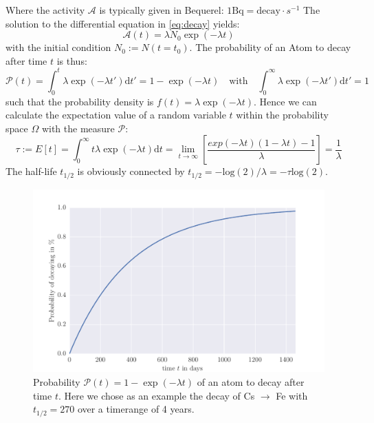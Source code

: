 Where the activity $\mathcal{A}$ is typically given in Bequerel: $1 \textrm{Bq}= \textrm{decay}\cdot s^{-1}$ 
The solution to the differential equation in \eqref{eq:decay} yields:
\begin{equation}
    \mathcal{A}(t) = \lambda N_0 \exp(-\lambda t)
\end{equation}
with the initial condition $N_0 := N(t=t_0)$. 
The probability of an Atom to decay after time $t$ is thus:
\begin{equation}
    \mathcal{P}(t) = \int_{0}^{t}\lambda \exp(-\lambda t')\mathrm{d}t' = 1 -  \exp(-\lambda t)  \quad
    \textrm{with} \quad \int_{0}^{\infty}\lambda \exp(-\lambda t')\mathrm{d}t' = 1
\end{equation}
such that the probability density is $f(t) = \lambda \exp(-\lambda t)$.
Hence we can calculate the expectation value of a random variable $t$ within the probability space
$\Omega$ with the measure  $\mathcal{P}$:
\begin{equation}
    \tau := E[t] = \int_{0}^{\infty} t \lambda \exp(-\lambda t) \mathrm{d}t 
    =\lim_{t \rightarrow \infty}\left[ \frac{exp(-\lambda t) (1-\lambda t) - 1 }{\lambda} \right] 
= \frac{1}{\lambda}
\end{equation}
The half-life $t_{1/2}$ is obviously connected by $t_{1/2}= -\mathrm{log}(2)/ \lambda = - \tau \mathrm{log}(2)$.
\begin{figure}[htpb]
    \centering
    \includegraphics[width=0.9\linewidth]{analysis/figures/halflife}
    \caption{Probability $\mathcal{P}(t) = 1 -  \exp(-\lambda t)$ of an atom to decay after time $t$.
        Here we chose as an example the decay of Cs $\rightarrow$ Fe with $t_{1/2}=270$ over a timerange
    of 4 years.}
    \label{fig:decay}
\end{figure}
\clearpage
